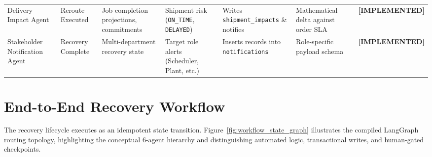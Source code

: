 \documentclass[10pt,twocolumn,a4paper]{article}
\newcommand{\claimtag}[1]{%
    \textsf{\textbf{\scriptsize\color{deepslate}[#1]}}%
}
\begin{document}
\begin{table}[t]
\begin{tabularx}{\textwidth}{>{\raggedright\arraybackslash}p{2.4cm}XXXX>{\raggedright\arraybackslash}X>{\raggedright\arraybackslash}p{1.8cm}}
Delivery Impact Agent & Reroute Executed & Job completion projections, commitments & Shipment risk (\texttt{ON\_TIME}, \texttt{DELAYED}) & Writes \texttt{shipment\_impacts} \& notifies & Mathematical delta against order SLA & \claimtag{IMPLEMENTED} \\
Stakeholder Notification Agent & Recovery Complete & Multi-department recovery state & Target role alerts (Scheduler, Plant, etc.) & Inserts records into \texttt{notifications} & Role-specific payload schema & \claimtag{IMPLEMENTED} \\
\bottomrule
\end{tabularx}
\end{table}

\section{End-to-End Recovery Workflow}
\label{sec:workflow}
The recovery lifecycle executes as an idempotent state transition. Figure~\ref{fig:workflow_state_graph} illustrates the compiled LangGraph routing topology, highlighting the conceptual 6-agent hierarchy and distinguishing automated logic, transactional writes, and human-gated checkpoints.
\end{document}
